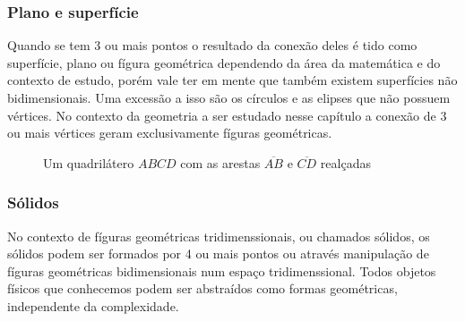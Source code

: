 \begin{multicols*}{2}


    \subsubsection*{Plano e superfície}
    Quando se tem 3 ou mais pontos o resultado da conexão deles é tido como superfície, plano ou fígura geométrica
    dependendo da área da matemática e do contexto de estudo, porém vale ter em mente que também existem superfícies
    não bidimensionais. Uma excessão a isso são os círculos e as elipses que não possuem vértices. No contexto da
    geometria a ser estudado nesse capítulo a conexão de 3 ou mais vértices geram exclusivamente fíguras geométricas.

    \begin{figure}[H]
        \centering
        \caption{Um quadrilátero $ABCD$ com as arestas $\overline{AB}$ e $\overline{CD}$ realçadas}
    \end{figure}


    \subsubsection*{Sólidos}
    No contexto de fíguras geométricas tridimenssionais, ou chamados sólidos, os sólidos podem ser formados por 4 ou
    mais pontos ou através manipulação de fíguras geométricas bidimensionais num espaço tridimenssional.
    Todos objetos físicos que conhecemos podem ser abstraídos como formas geométricas, independente da complexidade.


\end{multicols*}
